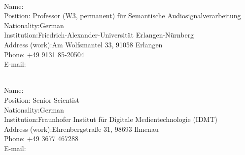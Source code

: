 \documentclass[11pt,a4paper]{article}
\theoremstyle{plain} \newtheorem{define}{Definition}[section]
\begin{document}
\vspace{-0.5cm}

\begin{tabbing}
\hspace{3cm}\= \\ \kill
Name: \\
Position:\> Professor (W3, permanent) f\"ur Semantische Audiosignalverarbeitung\\
Nationality:\>German \\
Institution:\>Friedrich-Alexander-Universit\"at Erlangen-N\"urnberg\\
Address (work):\>Am Wolfsmantel 33, 91058 Erlangen\\
Phone:\> +49 9131 85-20504\\
E-mail: \\
\end{tabbing}

\vspace{-1.5cm}

\begin{tabbing}
\hspace{3cm}\= \\ \kill
Name: \\
Position:\> Senior Scientist\\
Nationality:\>German \\
Institution:\>Fraunhofer Institut f\"ur Digitale Medientechnologie (IDMT)\\
Address (work):\>Ehrenbergstra{\ss}e 31, 98693 Ilmenau\\
Phone:\> +49 3677 467288 \\
E-mail: \\
\end{tabbing}
\end{document}
